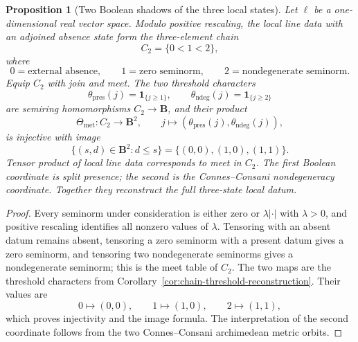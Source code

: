 \documentclass[11pt]{amsart}
\numberwithin{equation}{section}
\newtheorem{proposition}[theorem]{Proposition}
\theoremstyle{definition}
\newcommand{\B}{\mathbf B}
\begin{document}
\begin{proposition}[Two Boolean shadows of the three local states]
\label{prop:three-metric-support-states}
Let $\ell$ be a one-dimensional real vector space.  Modulo positive
rescaling, the local line data with an adjoined absence state form the
three-element chain
\[
C_2=\{0<1<2\},
\]
where
\[
0=\text{external absence},
\qquad
1=\text{zero seminorm},
\qquad
2=\text{nondegenerate seminorm}.
\]
Equip $C_2$ with join and meet.  The two threshold characters
\[
\theta_{\mathrm{pres}}(j)=\mathbf1_{\{j\ge1\}},
\qquad
\theta_{\mathrm{ndeg}}(j)=\mathbf1_{\{j\ge2\}}
\]
are semiring homomorphisms $C_2\to\B$, and their product
\[
\Theta_{\mathrm{met}}:C_2\longrightarrow\B^2,
\qquad
j\longmapsto
(\theta_{\mathrm{pres}}(j),\theta_{\mathrm{ndeg}}(j)),
\]
is injective with image
\[
\{(s,d)\in\B^2:d\leq s\}
=\{(0,0),(1,0),(1,1)\}.
\]
Tensor product of local line data corresponds to meet in $C_2$.
The first Boolean coordinate is split presence; the second is the
Connes--Consani nondegeneracy coordinate.  Together they reconstruct the
full three-state local datum.
\end{proposition}

\begin{proof}
Every seminorm under consideration is either zero or $\lambda|\cdot|$ with
$\lambda>0$, and positive rescaling identifies all nonzero values of
$\lambda$.  Tensoring with an absent datum remains absent, tensoring a zero
seminorm with a present datum gives a zero seminorm, and tensoring two
nondegenerate seminorms gives a nondegenerate seminorm; this is the meet
table of $C_2$.  The two maps are the threshold characters from
Corollary~\ref{cor:chain-threshold-reconstruction}.  Their values are
\[
0\mapsto(0,0),\qquad
1\mapsto(1,0),\qquad
2\mapsto(1,1),
\]
which proves injectivity and the image formula.  The interpretation of the
second coordinate follows from the two Connes--Consani archimedean metric
orbits.
\end{proof}
\end{document}
